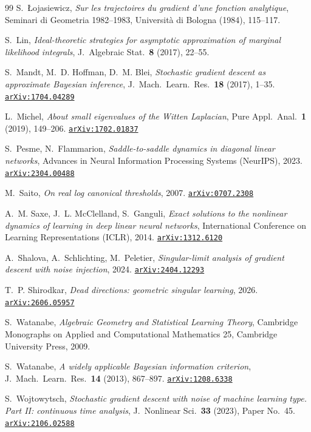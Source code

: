 \documentclass[11pt]{amsart}
\newcommand{\arxiv}[1]{\href{https://arxiv.org/abs/#1}{\texttt{arXiv:#1}}}
\theoremstyle{plain}
\theoremstyle{definition}
\begin{document}
\begin{thebibliography}{99}
S.~\L{}ojasiewicz,
\emph{Sur les trajectoires du gradient d'une fonction analytique},
Seminari di Geometria 1982--1983, Universit\`a di Bologna (1984), 115--117.

S.~Lin,
\emph{Ideal-theoretic strategies for asymptotic approximation of marginal likelihood integrals},
J.\ Algebraic Stat.\ \textbf{8} (2017), 22--55.

S.~Mandt, M.~D. Hoffman, D.~M. Blei,
\emph{Stochastic gradient descent as approximate Bayesian inference},
J.\ Mach.\ Learn.\ Res.\ \textbf{18} (2017), 1--35.
\arxiv{1704.04289}

L.~Michel,
\emph{About small eigenvalues of the Witten Laplacian},
Pure Appl.\ Anal.\ \textbf{1} (2019), 149--206.
\arxiv{1702.01837}

S.~Pesme, N.~Flammarion,
\emph{Saddle-to-saddle dynamics in diagonal linear networks},
Advances in Neural Information Processing Systems (NeurIPS), 2023.
\arxiv{2304.00488}

M.~Saito,
\emph{On real log canonical thresholds},
2007. \arxiv{0707.2308}

A.~M. Saxe, J.~L. McClelland, S.~Ganguli,
\emph{Exact solutions to the nonlinear dynamics of learning in deep linear neural networks},
International Conference on Learning Representations (ICLR), 2014.
\arxiv{1312.6120}

A.~Shalova, A.~Schlichting, M.~Peletier,
\emph{Singular-limit analysis of gradient descent with noise injection},
2024. \arxiv{2404.12293}

T.~P. Shirodkar,
\emph{Dead directions: geometric singular learning},
2026. \arxiv{2606.05957}

S.~Watanabe,
\emph{Algebraic Geometry and Statistical Learning Theory},
Cambridge Monographs on Applied and Computational Mathematics 25, Cambridge University Press, 2009.

S.~Watanabe,
\emph{A widely applicable Bayesian information criterion},
J.\ Mach.\ Learn.\ Res.\ \textbf{14} (2013), 867--897.
\arxiv{1208.6338}

S.~Wojtowytsch,
\emph{Stochastic gradient descent with noise of machine learning type. Part II: continuous time analysis},
J.\ Nonlinear Sci.\ \textbf{33} (2023), Paper No.\ 45.
\arxiv{2106.02588}

\end{thebibliography}
\end{document}
